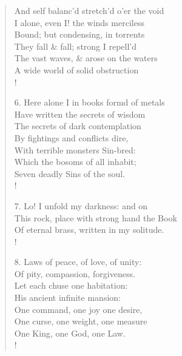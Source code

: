 \documentclass[9pt]{extarticle}
\begin{document}
\begin{verse}
\begin{altverse}
		And self balanc'd stretch'd o'er the void\\
		I alone, even I! the winds merciless\\
		Bound; but condensing, in torrents\\
		They fall \& fall; strong I repell'd\\
		The vast waves, \& arose on the waters\\
		A wide world of solid obstruction\\!
		
		6. Here alone I in books formd of metals\\
		Have written the secrets of wisdom\\
		The secrets of dark contemplation\\
		By fightings and conflicts dire,\\
		With terrible monsters Sin-bred:\\
		Which the bosoms of all inhabit;\\
		Seven deadly Sins of the soul.\\!
		
		7. Lo! I unfold my darkness: and on\\
		This rock, place with strong hand the Book\\
		Of eternal brass, written in my solitude.\\!
		
		8. Laws of peace, of love, of unity:\\
		Of pity, compassion, forgiveness.\\
		Let each chuse one habitation:\\
		His ancient infinite mansion:\\
		One command, one joy one desire,\\
		One curse, one weight, one measure\\
		One King, one God, one Law.\\!
		
\end{altverse}
\end{verse}	
\end{document}
